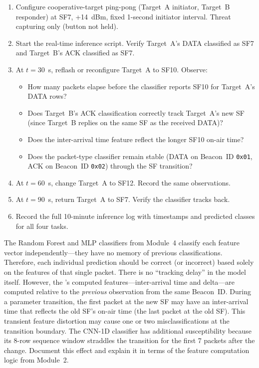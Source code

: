 \documentclass[11pt,letterpaper]{article}
\begin{document}
	\begin{tcolorbox}[infobox={Test Protocol: S2}]
		\begin{enumerate}
			\item Configure cooperative-target ping-pong (Target~A initiator, Target~B responder) at SF7, +14~dBm, fixed 1-second initiator interval. Threat capturing only (button not held).
			\item Start the real-time inference script. Verify Target~A's DATA classified as SF7 and Target~B's ACK classified as SF7.
			\item At $t = 30$~s, reflash or reconfigure Target~A to SF10. Observe:
			\begin{itemize}
				\item How many packets elapse before the classifier reports SF10 for Target~A's DATA rows?
				\item Does Target~B's ACK classification correctly track Target~A's new SF (since Target~B replies on the same SF as the received DATA)?
				\item Does the inter-arrival time feature reflect the longer SF10 on-air time?
				\item Does the packet-type classifier remain stable (DATA on Beacon~ID \texttt{0x01}, ACK on Beacon~ID \texttt{0x02}) through the SF transition?
			\end{itemize}
			\item At $t = 60$~s, change Target~A to SF12. Record the same observations.
			\item At $t = 90$~s, return Target~A to SF7. Verify the classifier tracks back.
			\item Record the full 10-minute inference log with timestamps and predicted classes for all four tasks.
		\end{enumerate}
	\end{tcolorbox}

	\begin{tcolorbox}[warning={Transition Behavior Expectations}]
		The Random Forest and MLP classifiers from Module~4 classify each feature vector independently---they have no memory of previous classifications. Therefore, each individual prediction should be correct (or incorrect) based solely on the features of that single packet. There is no ``tracking delay'' in the model itself. However, the \FPGA{}'s computed features---inter-arrival time and \RSSI{} delta---are computed relative to the \emph{previous} observation from the same Beacon~ID. During a parameter transition, the first packet at the new SF may have an inter-arrival time that reflects the old SF's on-air time (the last packet at the old SF). This transient feature distortion may cause one or two misclassifications at the transition boundary. The CNN-1D classifier has additional susceptibility because its 8-row sequence window straddles the transition for the first 7 packets after the change. Document this effect and explain it in terms of the \FPGA{} feature computation logic from Module~2.
	\end{tcolorbox}
\end{document}
